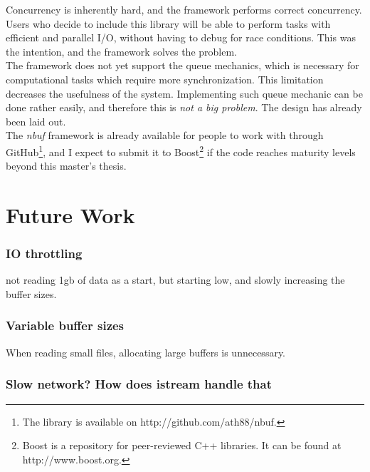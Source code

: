 \documentclass[a4paper]{article}
\newcommand{\nbuf}{\textit{nbuf} }
\begin{document}
Concurrency is inherently hard, and the framework performs correct concurrency. Users who decide to include this library will be able to perform tasks with efficient and parallel I/O, without having to debug for race conditions. This was the intention, and the framework solves the problem.\\

The framework does not yet support the queue mechanics, which is necessary for computational tasks which require more synchronization. This limitation decreases the usefulness of the system. Implementing such queue mechanic can be done rather easily, and therefore this is \textit{not a big problem}. The design has already been laid out.\\

The \nbuf framework is already available for people to work with through GitHub\footnote{The library is available on http://github.com/ath88/nbuf.}, and I expect to submit it to Boost\footnote{Boost is a repository for peer-reviewed C++ libraries. It can be found at http://www.boost.org.} if the code reaches maturity levels beyond this master's thesis.


\newpage
\section{Future Work}
\subsubsection{IO throttling}
not reading 1gb of data as a start, but starting low, and slowly increasing the buffer sizes.

\subsubsection{Variable buffer sizes}
When reading small files, allocating large buffers is unnecessary.

\subsubsection{Slow network? How does istream handle that}







\end{document}
